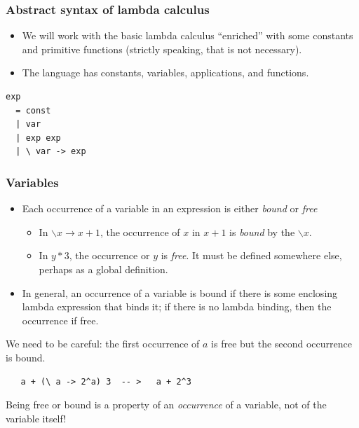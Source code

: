 \documentclass{beamer}
\begin{document}
\begin{frame}[fragile]
\frametitle{Abstract syntax of lambda calculus}

\begin{itemize}
\item We will work with the basic lambda calculus ``enriched'' with
  some constants and primitive functions (strictly speaking, that
  is not necessary).
\item The language has constants, variables, applications, and
  functions.
\end{itemize}

\begin{verbatim}
exp
  = const
  | var
  | exp exp
  | \ var -> exp
\end{verbatim}

\end{frame}

\begin{frame}[fragile]
\frametitle{Variables}

\begin{itemize}
\item Each occurrence of a variable in an expression is either
  \emph{bound} or \emph{free}
  \begin{itemize}
  \item In $\backslash x \rightarrow x+1$, the occurrence of $x$ in $x+1$ is
    \emph{bound} by the $\backslash x$.
  \item In $y*3$, the occurrence or $y$ is \emph{free}.  It must be
    defined somewhere else, perhaps as a global definition.
  \end{itemize}
\item In general, an occurrence of a variable is bound if there is
  some enclosing lambda expression that binds it; if there is no
  lambda binding, then the occurrence if free.
\end{itemize}

We need to be careful: the first occurrence of $a$ is free but the
second occurrence is bound.

\begin{verbatim}
   a + (\ a -> 2^a) 3  -- >   a + 2^3
\end{verbatim}

Being free or bound is a property of an \emph{occurrence} of a
variable, not of the variable itself!

\end{frame}
\end{document}
